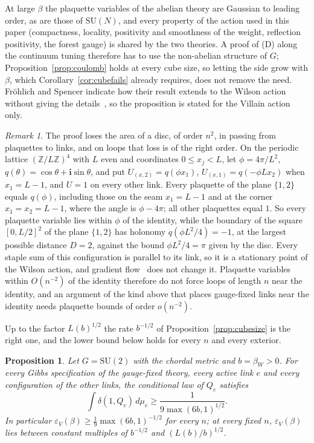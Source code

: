 \documentclass[aps,prd,twocolumn,superscriptaddress,nofootinbib,longbibliography,floatfix,amsmath,amssymb,10pt]{revtex4-2}
\newtheorem{proposition}[theorem]{Proposition}
\theoremstyle{definition}
\theoremstyle{remark}
\newtheorem{remark}[theorem]{Remark}
\newcommand{\Z}{\mathbb{Z}}
\newcommand{\SU}{\mathrm{SU}}
\begin{document}
At large $\beta$ the plaquette variables of the abelian theory are
Gaussian to leading order, as are those of $\SU(N)$, and every property of
the action used in this paper (compactness, locality, positivity and
smoothness of the weight, reflection positivity, the forest gauge) is shared
by the two theories. A proof of (D) along the continuum tuning therefore has
to use the non-abelian structure of $G$; Proposition~\ref{prop:coulomb}
holds at every cube size, so letting the side grow with $\beta$, which
Corollary~\ref{cor:cubefails} already requires, does not remove the need.
Fr\"ohlich and Spencer indicate how their result extends to the Wilson
action without giving the details~\cite[Sect.~2]{FS82}, so the
proposition is stated for the Villain action only.

\begin{remark}\label{rem:fluxloop}
The proof loses the area of a disc, of order $n^2$, in passing from plaquettes
to links, and on loops that loss is of the right order. On the periodic
lattice $(\Z/L\Z)^4$ with $L$ even and coordinates $0\le x_j<L$, let
$\phi=4\pi/L^2$, $q(\theta)=\cos\theta+\mathbf i\sin\theta$, and put
$U_{(x,2)}=q(\phi x_1)$, $U_{(x,1)}=q(-\phi Lx_2)$ when $x_1=L-1$, and $U=1$ on
every other link. Every plaquette of the plane $\{1,2\}$ equals $q(\phi)$,
including those on the seam $x_1=L-1$ and at the corner $x_1=x_2=L-1$, where
the angle is $\phi-4\pi$; all other plaquettes equal $1$. So every plaquette
variable lies within $\phi$ of the identity, while the boundary of the square
$[0,L/2]^2$ of the plane $\{1,2\}$ has holonomy $q(\phi L^2/4)=-1$, at the
largest possible distance $D=2$, against the bound $\phi L^2/4=\pi$ given by
the disc. Every staple sum of this configuration is parallel to its link, so
it is a stationary point of the Wilson action, and gradient
flow~\cite{Lus10} does not change it. Plaquette variables within $O(n^{-2})$
of the identity therefore do not force loops of length $n$ near the identity,
and an argument of the kind above that places gauge-fixed links near the
identity needs plaquette bounds of order $o(n^{-2})$.
\end{remark}

Up to the factor $L(b)^{1/2}$ the rate $b^{-1/2}$ of
Proposition~\ref{prop:cubesize} is the right one, and the lower bound below
holds for every $n$ and every exterior.

\begin{proposition}\label{prop:epslower}
Let $G=\SU(2)$ with the chordal metric and $b=\beta_W>0$. For every Gibbs
specification of the gauge-fixed theory, every active link $e$ and every
configuration of the other links, the conditional law of $Q_e$ satisfies
\[
\int\delta(1,Q_e)\,d\mu_e\ge\frac1{9\max(6b,1)^{1/2}} .
\]
In particular $\varepsilon_V(\beta)\ge\frac19\max(6b,1)^{-1/2}$ for every
$n$; at every fixed $n$, $\varepsilon_V(\beta)$ lies between constant
multiples of $b^{-1/2}$ and $(L(b)/b)^{1/2}$.
\end{proposition}
\end{document}
